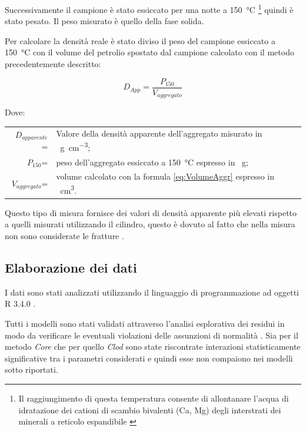 \documentclass[11pt, a4paper, openright, titlepage, final, language = italian]{book}
\begin{document}
Successivamente il campione \`e stato essiccato per una notte a
\SI{150}{\degreeCelsius} \footnote{Il raggiungimento di questa
  temperatura consente di allontanare l'acqua di idratazione dei
  cationi di scambio bivalenti (Ca, Mg) degli interstrati dei minerali
  a reticolo espandibile \citep{Monnier_1973}} quindi \`e stato
pesato. Il peso misurato \`e quello della fase solida.


Per calcolare la densit\`a reale \`e stato diviso il peso del campione
essiccato a \SI{150}{\celsius} con il volume del petrolio spostato dal
campione calcolato con il metodo precedentemente descritto:

\begin{equation}
  \label{eq:densitapetrolio}
  D_{App} = \frac{P_{150}}{V_{aggregato}}
\end{equation}

Dove:\\
\begin{tabular}{rp{12cm}}
  $D_{apparente}$=  & Valore della densit\`a apparente dell'aggregato
                       misurato in \SI{}{\gram\per\cubic\cm};\\
  $P_{150}$=       & peso dell'aggregato essiccato a
                     \SI{150}{\celsius} espresso in \SI{}{\gram};\\
  $V_{aggregato}$=  & volume calcolato con la formula
                      \ref{eq:VolumeAggr} espresso in \SI{}{\cubic\cm}.
\end{tabular}

Questo tipo di misura fornisce dei valori di densit\`a apparente pi\`u
elevati rispetto a quelli misurati utilizzando il cilindro, questo \`e
dovuto al fatto che nella misura non sono considerate le fratture
\citep{tisdall1951comparison}.

\subsection{Elaborazione dei dati \label{ssec:modello}}

I dati sono stati analizzati utilizzando il linguaggio di
programmazione ad oggetti R 3.4.0 \citep{r_programming}.




Tutti i modelli sono stati validati attraverso l'analisi esplorativa
dei residui in modo da verificare le eventuali violazioni delle
assunzioni di normalit\`a \citep{stefanini2007introduzione}.
 Sia per il metodo \emph{Core} che per quello \emph{Clod}
sono state riscontrate interazioni statisticamente significative tra i
parametri considerati e quindi esse non compaiono nei modelli sotto
riportati.
\end{document}
